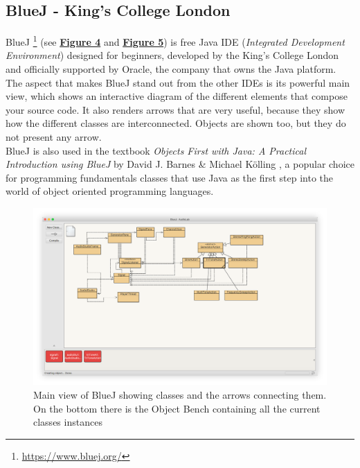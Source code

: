 \documentclass[]{usiinfbachelorproject}
\begin{document}
\subsection{BlueJ - King's College London}

BlueJ \footnote{\url{https://www.bluej.org/}} (see \hyperref[bluej_classes_objects]{\textbf{Figure 4}} and \hyperref[bluej_objects_open]{\textbf{Figure 5}}) is free Java IDE (\emph{Integrated Development Environment}) designed for beginners, developed by the King's College London and officially supported by Oracle, the company that owns the Java platform.
The aspect that makes BlueJ stand out from the other IDEs is its powerful main view, which shows an interactive diagram of the different elements that compose your source code. It also renders arrows that are very useful, because they show how the different classes are interconnected. Objects are shown too, but they do not present any arrow.\\
BlueJ is also used in the textbook \emph{Objects First with Java: A Practical Introduction using BlueJ} by David J. Barnes \& Michael K\"{o}lling \cite{barnes2016objects}, a popular choice for programming fundamentals classes that use Java as the first step into the world of object oriented programming languages.

\begin{figure}[h!]
\centering
\includegraphics[width=\textwidth]{figures/bluej_classes_objects.png}
\caption {Main view of BlueJ showing classes and the arrows connecting them. On the bottom there is the Object Bench containing all the current classes instances}
\label {bluej_classes_objects}
\end{figure}
\end{document}
